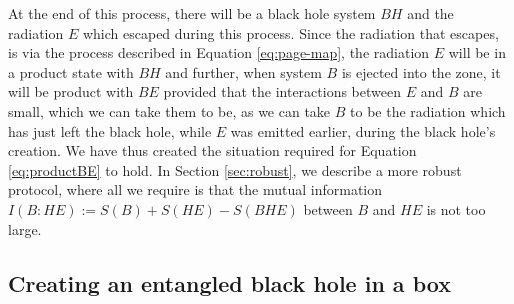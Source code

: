 \documentclass[12pt,a4paper]{article}
\begin{document}
At the end of this process, there will be a black hole system $BH$ and the radiation $E$ which escaped during this process. Since the radiation that escapes, is via the process described in Equation \eqref{eq:page-map}, the radiation $E$ will be in a product state with $BH$ and further, when system $B$ is ejected into the zone, it will be product with $BE$ provided that the interactions between $E$ and $B$ are small, which we can take them to be, as we can take $B$ to be the radiation which has just left the black hole, while $E$ was emitted earlier, during the black hole's creation. We have thus created the situation required for Equation \eqref{eq:productBE} to hold. In Section \ref{sec:robust}, we describe a more robust protocol, where all we require is that the mutual information $I(B:HE):=S(B)+S(HE)-S(BHE)$ between $B$ and $HE$ is not too large.

\subsection{Creating an entangled black hole in a box}
\label{ss:creatingbox}
\end{document}
